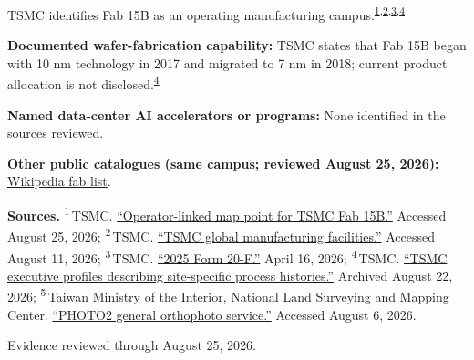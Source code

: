 \begin{minipage}[t][0.90\textheight][t]{\textwidth}
\begin{minipage}[t]{\textwidth}
\begin{minipage}[t]{0.32\textwidth}
\medskip
{\footnotesize TSMC identifies Fab 15B as an operating manufacturing campus.\nobreak\textsuperscript{\href{\detokenize{https://maps.app.goo.gl/ctdzf84Wjd5HqFJ28}}{\textcolor{accent}{1}},\href{\detokenize{https://www.tsmc.com/english/aboutTSMC/TSMC_Fabs}}{\textcolor{accent}{2}},\href{\detokenize{https://investor.tsmc.com/sites/ir/sec-filings/2025_20F}\%\detokenize{20Report.pdf}}{\textcolor{accent}{3}},\href{\detokenize{https://web.archive.org/web/20260822170034/https://www.tsmc.com/english/aboutTSMC/executives.htm}}{\textcolor{accent}{4}}}\par}
\medskip
{\footnotesize\textbf{Documented wafer-fabrication capability:} TSMC states that Fab 15B began with 10 nm technology in 2017 and migrated to 7 nm in 2018; current product allocation is not disclosed.\nobreak\textsuperscript{\href{\detokenize{https://web.archive.org/web/20260822170034/https://www.tsmc.com/english/aboutTSMC/executives.htm}}{\textcolor{accent}{4}}}\par}
\end{minipage}
\end{minipage}
\par\vspace{0.65em}
\medskip
{\footnotesize\textbf{Named data-center AI accelerators or programs:} None identified in the sources reviewed.\par}
\smallskip
{\sffamily\scriptsize\color{black!62}\textbf{Other public catalogues (same campus; reviewed August 25, 2026):} \href{\detokenize{https://en.wikipedia.org/w/index.php?title=List_of_semiconductor_fabrication_plants&oldid=1370451124}\#\detokenize{Open_plants}}{Wikipedia fab list}.\par}
\medskip
{\sffamily\scriptsize\setlength{\emergencystretch}{1.5em}\textbf{Sources.} \textsuperscript{1}\,TSMC. \href{\detokenize{https://maps.app.goo.gl/ctdzf84Wjd5HqFJ28}}{\enquote{Operator-linked map point for TSMC Fab 15B.}} Accessed August 25, 2026; \textsuperscript{2}\,TSMC. \href{\detokenize{https://www.tsmc.com/english/aboutTSMC/TSMC_Fabs}}{\enquote{TSMC global manufacturing facilities.}} Accessed August 11, 2026; \textsuperscript{3}\,TSMC. \href{\detokenize{https://investor.tsmc.com/sites/ir/sec-filings/2025_20F}\%\detokenize{20Report.pdf}}{\enquote{2025 Form 20-F.}} April 16, 2026; \textsuperscript{4}\,TSMC. \href{\detokenize{https://web.archive.org/web/20260822170034/https://www.tsmc.com/english/aboutTSMC/executives.htm}}{\enquote{TSMC executive profiles describing site-specific process histories.}} Archived August 22, 2026; \textsuperscript{5}\,Taiwan Ministry of the Interior, National Land Surveying and Mapping Center. \href{\detokenize{https://maps.nlsc.gov.tw/S09SOA/pro/Wms_ajax_list.jsp}}{\enquote{PHOTO2 general orthophoto service.}} Accessed August 6, 2026.\par}
\vfill
\noindent{\color{hairline}\rule{\linewidth}{0.4pt}}\par\smallskip
{\sffamily\scriptsize\color{black!58} Evidence reviewed through August 25, 2026.\par}
\end{minipage}
